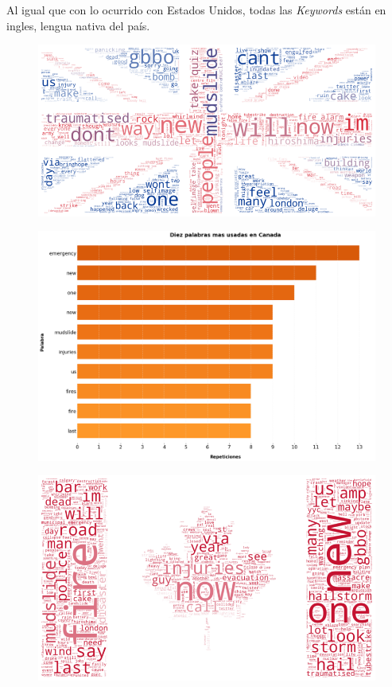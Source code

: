 \documentclass[titlepage,a4paper]{article}
\begin{document}
    Al igual que con lo ocurrido con Estados Unidos, todas las \textit{Keywords} están en ingles, lengua nativa del país.
    
    \begin{figure}[H]
    \centering
    \includegraphics[width=1\textwidth]{graficos/Analisis de Locacion/bandera_uk.png}
    \caption{}
    \end{figure}

    \begin{figure}[H]
    \centering
    \includegraphics[width=1\textwidth]{graficos/Analisis de Locacion/10_palabras_mas_usadas_canada.png}
    \caption{}
    \end{figure}
    
    
    \begin{figure}[H]
    \centering
    \includegraphics[width=1\textwidth]{graficos/Analisis de Locacion/bandera_canada.png}
    \caption{}    
    \end{figure}
    
\end{document}

